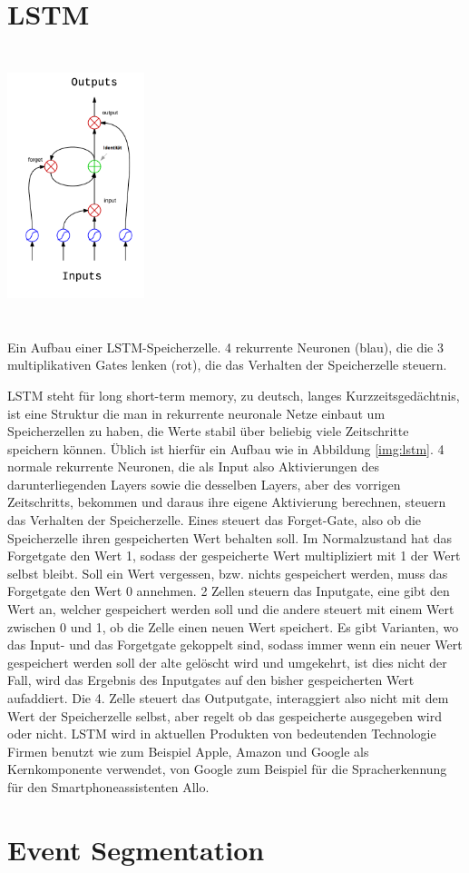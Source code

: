 \section{LSTM}
\begin{floatingfigure}
	\centering
	\includegraphics[width=0.3\textwidth, height=300px]{pics/lstm.png}	
	\caption{Ein Aufbau einer LSTM-Speicherzelle. 4 rekurrente Neuronen (blau), die die 3 multiplikativen Gates lenken (rot), die das Verhalten der Speicherzelle steuern.    \cite{bib:lstm}}
	\label{img:lstm}
\end{floatingfigure}
LSTM steht für long short-term memory, zu deutsch, langes Kurzzeitsgedächtnis, ist eine Struktur die man in rekurrente neuronale Netze einbaut um Speicherzellen zu haben, die Werte stabil über beliebig viele Zeitschritte speichern können. Üblich ist hierfür ein Aufbau wie in Abbildung \ref{img:lstm}. 4 normale rekurrente Neuronen, die als Input also Aktivierungen des darunterliegenden Layers sowie die desselben Layers, aber des vorrigen Zeitschritts, bekommen und daraus ihre eigene Aktivierung berechnen, steuern das Verhalten der Speicherzelle. Eines steuert das Forget-Gate, also ob die Speicherzelle ihren gespeicherten Wert behalten soll. Im Normalzustand hat das Forgetgate den Wert 1, sodass der gespeicherte Wert multipliziert mit 1 der Wert selbst bleibt. Soll ein Wert vergessen, bzw. nichts gespeichert werden, muss das Forgetgate den Wert 0 annehmen. 2 Zellen steuern das Inputgate, eine gibt den Wert an, welcher gespeichert werden soll und die andere steuert mit einem Wert zwischen 0 und 1, ob die Zelle einen neuen Wert speichert. Es gibt Varianten, wo das Input- und das Forgetgate gekoppelt sind, sodass immer wenn ein neuer Wert gespeichert werden soll der alte gelöscht wird und umgekehrt, ist dies nicht der Fall, wird das Ergebnis des Inputgates auf den bisher gespeicherten Wert aufaddiert. Die 4. Zelle steuert das Outputgate, interaggiert also nicht mit dem Wert der Speicherzelle selbst, aber regelt ob das gespeicherte ausgegeben wird oder nicht. 
LSTM wird in aktuellen Produkten von bedeutenden Technologie Firmen benutzt wie zum Beispiel Apple\cite{bib:apple}, Amazon\cite{bib:amazon} und Google als Kernkomponente verwendet, von Google zum Beispiel für die Spracherkennung für den Smartphoneassistenten Allo\cite{bib:allo}.


\section{Event Segmentation}